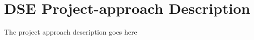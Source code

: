 \section{DSE Project-approach Description}
\label{dseProjectApproachDescription}
The project approach description goes here